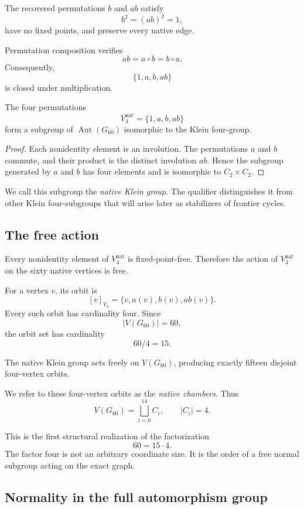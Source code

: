 The recovered permutations \(b\) and \(ab\) satisfy
\[
b^2=(ab)^2=1,
\]
have no fixed points, and preserve every native edge.

Permutation composition verifies
\[
ab=a\circ b=b\circ a.
\]
Consequently,
\[
\{1,a,b,ab\}
\]
is closed under multiplication.

\begin{theorem}
The four permutations
\[
V_4^{\mathrm{nat}}
=
\{1,a,b,ab\}
\]
form a subgroup of \(\operatorname{Aut}(G_{60})\) isomorphic to the
Klein four-group.
\end{theorem}

\begin{proof}
Each nonidentity element is an involution. The permutations \(a\) and
\(b\) commute, and their product is the distinct involution \(ab\).
Hence the subgroup generated by \(a\) and \(b\) has four elements and
is isomorphic to \(C_2\times C_2\).
\end{proof}

We call this subgroup the \emph{native Klein group}. The qualifier
distinguishes it from other Klein four-subgroups that will arise later
as stabilizers of frontier cycles.

\subsection{The free action}

Every nonidentity element of \(V_4^{\mathrm{nat}}\) is fixed-point-free.
Therefore the action of \(V_4^{\mathrm{nat}}\) on the sixty native
vertices is free.

For a vertex \(v\), its orbit is
\[
[v]_{V_4}
=
\{v,a(v),b(v),ab(v)\}.
\]
Every such orbit has cardinality four. Since
\[
|V(G_{60})|=60,
\]
the orbit set has cardinality
\[
60/4=15.
\]

\begin{proposition}
The native Klein group acts freely on \(V(G_{60})\), producing exactly
fifteen disjoint four-vertex orbits.
\end{proposition}

We refer to these four-vertex orbits as the \emph{native chambers}.
Thus
\[
V(G_{60})
=
\bigsqcup_{i=0}^{14} C_i,
\qquad
|C_i|=4.
\]

This is the first structural realization of the factorization
\[
60=15\cdot4.
\]
The factor four is not an arbitrary coordinate size. It is the order
of a free normal subgroup acting on the exact graph.

\subsection{Normality in the full automorphism group}

